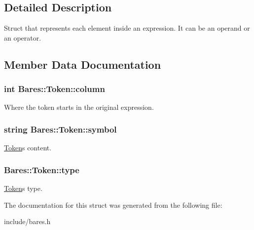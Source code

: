 \subsection{Detailed Description}
Struct that represents each element inside an expression. It can be an operand or an operator. 

\subsection{Member Data Documentation}
\subsubsection[{column}]{\setlength{\rightskip}{0pt plus 5cm}int Bares\+::\+Token\+::column}\hypertarget{structBares_1_1Token_af3adba034744030cd8179d3627098b48}{}\label{structBares_1_1Token_af3adba034744030cd8179d3627098b48}
Where the token starts in the original expression. 
\subsubsection[{symbol}]{\setlength{\rightskip}{0pt plus 5cm}string Bares\+::\+Token\+::symbol}\hypertarget{structBares_1_1Token_a84b0d3edd9f59ac058c494b007770578}{}\label{structBares_1_1Token_a84b0d3edd9f59ac058c494b007770578}
\hyperlink{structBares_1_1Token}{Token}\textquotesingle{}s content. 
\subsubsection[{type}]{ Bares\+::\+Token\+::type}\hypertarget{structBares_1_1Token_a64dd409f656e8345531df4025986be40}{}\label{structBares_1_1Token_a64dd409f656e8345531df4025986be40}
\hyperlink{structBares_1_1Token}{Token}\textquotesingle{}s type. 

The documentation for this struct was generated from the following file\+:\begin{DoxyCompactItemize}
\item 
include/bares.\+h\end{DoxyCompactItemize}
